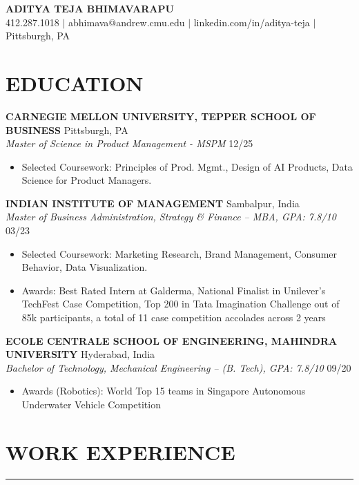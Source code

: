 \documentclass[10pt,letterpaper]{article}
\newcommand{\sectionline}{\par\vspace{-0.5em}\noindent\rule{\textwidth}{0.6pt}\vspace{0.3em}\par}
\begin{document}
\begin{center}
  {\LARGE \textbf{ADITYA TEJA BHIMAVARAPU}}\\
  412.287.1018 $|$ abhimava@andrew.cmu.edu $|$ linkedin.com/in/aditya-teja $|$ Pittsburgh, PA
\end{center}
\vspace{0.5em}

\section*{EDUCATION}

\noindent\textbf{CARNEGIE MELLON UNIVERSITY, TEPPER SCHOOL OF BUSINESS} \hfill Pittsburgh, PA\\
\textit{Master of Science in Product Management - MSPM} \hfill 12/25
\begin{itemize}
  \item Selected Coursework: Principles of Prod. Mgmt., Design of AI Products, Data Science for Product Managers.
\end{itemize}

\noindent\textbf{INDIAN INSTITUTE OF MANAGEMENT} \hfill Sambalpur, India\\
\textit{Master of Business Administration, Strategy \& Finance -- MBA, GPA: 7.8/10} \hfill 03/23
\begin{itemize}
  \item Selected Coursework: Marketing Research, Brand Management, Consumer Behavior, Data Visualization.
  \item Awards: Best Rated Intern at Galderma, National Finalist in Unilever's TechFest Case Competition, Top 200 in Tata Imagination Challenge out of 85k participants, a total of 11 case competition accolades across 2 years
\end{itemize}

\noindent\textbf{ECOLE CENTRALE SCHOOL OF ENGINEERING, MAHINDRA UNIVERSITY} \hfill Hyderabad, India\\
\textit{Bachelor of Technology, Mechanical Engineering -- (B. Tech), GPA: 7.8/10} \hfill 09/20
\begin{itemize}
  \item Awards (Robotics): World Top 15 teams in Singapore Autonomous Underwater Vehicle Competition
\end{itemize}

\section*{WORK EXPERIENCE}
\sectionline
\end{document}
